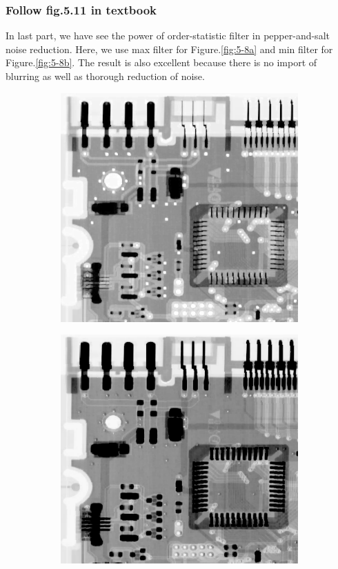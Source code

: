 
\subsubsection{Follow fig.5.11 in textbook}
In last part, we have see the power of order-statistic filter in pepper-and-salt noise reduction. Here, we use max filter for Figure.\ref{fig:5-8a} and min filter for Figure.\ref{fig:5-8b}. The result is also excellent because there is no import of blurring as well as thorough reduction of noise.
\begin{figure}[h]
	\centering
	\begin{subfigure}[b]{0.4\linewidth}
		\includegraphics[width=\linewidth]{myfigure/p4/42-pepper-max.png}
		\caption{}
		\label{fig:5-11a}
	\end{subfigure}
	\begin{subfigure}[b]{0.4\linewidth}
		\includegraphics[width=\linewidth]{myfigure/p4/42-salt-min.png}

\end{subfigure}
\end{figure}
